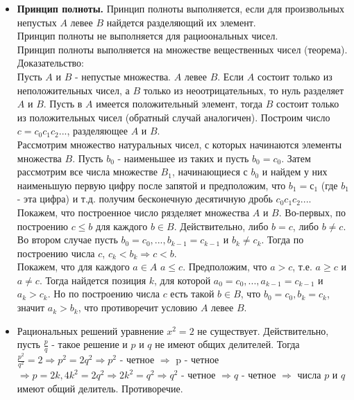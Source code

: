 \documentclass[12pt,a4paper]{article}
\begin{document}
\begin{itemize}
\item \textbf{Принцип полноты. }
Принцип полноты выполняется, если для произвольных непустых $A$ левее $B$ найдется разделяющий их элемент. \\
Принцип полноты не выполняется для рациоональных чисел. \\
Принцип полноты выполняется на множестве вещественных чисел (теорема).\\
Доказательство: \\
Пусть $A$ и $B$ - непустые множества.  $A$ левее $B$. Если $A$ состоит только из неположительных чисел, а $B$ только из неоотрицательных, то нуль разделяет $A$ и $B$. Пусть в $A$ имеется положительный элемент, тогда $B$ состоит только из положительных чисел (обратный случай аналогичен). Построим число $c = c_0c_1c_2...$, разделяющее $A$ и $B$. \\
Рассмотрим множество натуральных чисел, с которых начинаются элементы множества $B$. Пусть $b_0$ - наименьшее из таких и пусть $b_0 = c_0$. Затем рассмотрим все числа множестве $B_1$, начинающиеся с $b_0$ и найдем у них наименьшую первую цифру после запятой и предположим, что $b_1=с_1$ (где $b_1$ - эта цифра) и т.д. получим бесконечную десятичную дробь $c_0c_1c_2...$. Покажем, что построенное число рязделяет множества $A$ и $B$. Во-первых, по построению $c \leq b$ для каждого $b \in B$. Действительно, либо $b = c$, либо $b \neq c$. Во втором случае пусть $b_0 = c_0, ..., b_{k-1} = c_{k-1}$ и $b_k \neq c_k$. Тогда по построению числа $c$, $c_k < b_k \Rightarrow c < b$. \\
Покажем, что для каждого $a \in A $ $a \leq c$. Предположим, что $a > c$, т.е. $a \geq c$ и $a \neq c$. Тогда найдется позиция $k$, для которой $a_0=c_0, ..., a_{k-1}=c_{k-1}$ и $a_k > c_k$. Но по построению числа $c$ есть такой $b \in B$, что $b_0 = c_0, b_k=c_k$, значит $a_k > b_k$, что противоречит условию $A$ левее $B$. 

\item Рациональных решений уравнение $x^2=2$ не существует. Действительно, пусть $\frac{p}{q}$ - такое решение и $p$ и $q$ не имеют общих делителей. Тогда $\frac{p^2}{q^2} = 2 \Rightarrow p^2=2q^2 \Rightarrow p^2$ - четное $\Rightarrow$ p - четное $\Rightarrow p=2k, 4k^2=2q^2 \Rightarrow 2k^2 = q^2 \Rightarrow q^2$ - четное $\Rightarrow q$ - четное $\Rightarrow$ числа $p$ и $q$ имеют общий делитель. Противоречие.
\end{itemize}
\end{document}
